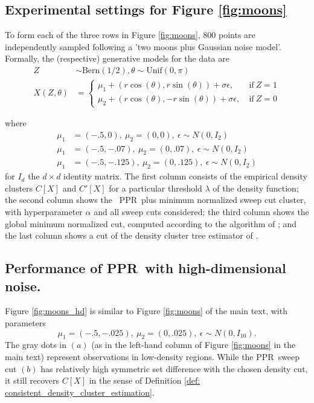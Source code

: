 \documentclass[11pt,twoside]{article}
\theoremstyle{definition}
\newcommand{\1}{\mathbbm{1}}
\newcommand{\Xbf}{X}
\newcommand{\pprspace}{{\sc PPR~}}
\begin{document}
\subsection{Experimental settings for Figure \ref{fig:moons}}

To form each of the three rows in Figure \ref{fig:moons}, 800 points are independently sampled following a 'two moons plus Gaussian noise model'. Formally, the (respective) generative models for the data are
\begin{align}
Z & \sim \textrm{Bern}(1/2), \theta \sim \textrm{Unif}(0, \pi) \\
X(Z,\theta) & = 
\begin{cases}
\mu_1 + (r \cos(\theta), r \sin(\theta)) + \sigma \epsilon,~ & \text{if}~ Z = 1 \\
\mu_2 + (r \cos(\theta), - r \sin(\theta)) + \sigma \epsilon,~ & \text{if}~ Z = 0
\end{cases}
\end{align}

where 
\begin{align*}
\mu_1 & = (-.5, 0),~ \mu_2 = (0,0),~ \epsilon \sim N(0, I_2) \tag{row 1} \\
\mu_1 & = (-.5, -.07),~ \mu_2 = (0,.07),~ \epsilon \sim N(0, I_2) \tag{row 2} \\
\mu_1 & = (-.5, -.125),~ \mu_2 = (0,.125),~ \epsilon \sim N(0, I_2) \tag{row 3} 
\end{align*}
for $I_d$ the $d \times d$ identity matrix. The first column consists of the empirical density clusters $C[\Xbf]$ and $C'[\Xbf]$ for a particular threshold $\lambda$ of the density function; the second column shows the ~\pprspace plus minimum normalized sweep cut cluster, with hyperparameter $\alpha$ and all sweep cuts considered; the third column shows the global minimum normalized cut, computed according to the algorithm of \cite{szlam2010}; and the last column shows a cut of the density cluster tree estimator of \cite{chaudhuri2010}.

\subsection{Performance of \pprspace with high-dimensional noise.}

Figure \ref{fig:moons_hd} is similar to Figure \ref{fig:moons} of the main text, with parameters
\begin{equation*}
\mu_1 = (-.5, -.025),~ \mu_2 = (0,.025),~ \epsilon \sim N(0, I_{10}).
\end{equation*}
The gray dots in $(a)$ (as in the left-hand column of Figure \ref{fig:moons} in the main text) represent observations in low-density regions. While the \pprspace sweep cut $(b)$ has relatively high symmetric set difference with the chosen density cut, it still recovers $C[\Xbf]$ in the sense of Definition \ref{def: consistent_density_cluster_estimation}.
\end{document}
